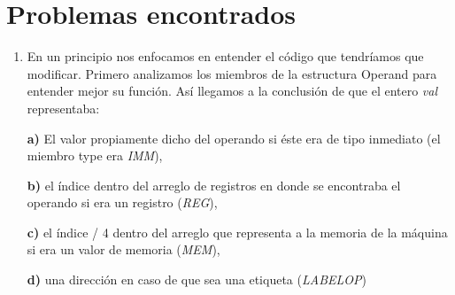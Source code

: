 \documentclass[a4paper,12pt]{article}
\begin{document}
\section{Problemas encontrados}

\begin{enumerate}
\item 
En un principio nos enfocamos en entender el c\'odigo que tendr\'iamos que modificar. Primero analizamos los miembros de la estructura Operand para entender mejor su funci\'on. As\'i llegamos a la conclusi\'on de que el entero \emph{val} representaba:
 
	\textbf{a)} El valor propiamente dicho del operando si \'este era de tipo inmediato (el miembro type era \emph{IMM}),
	
	\textbf{b)} el \'indice dentro del arreglo de registros en donde se encontraba el operando si era un registro (\emph{REG}),
	
	\textbf{c)} el \'indice / 4 dentro del arreglo que representa a la memoria de la m\'aquina si era un valor de memoria (\emph{MEM}),
	
	\textbf{d)} una direcci\'on en caso de que sea una etiqueta (\emph{LABELOP})\\


\end{enumerate}
\end{document}
